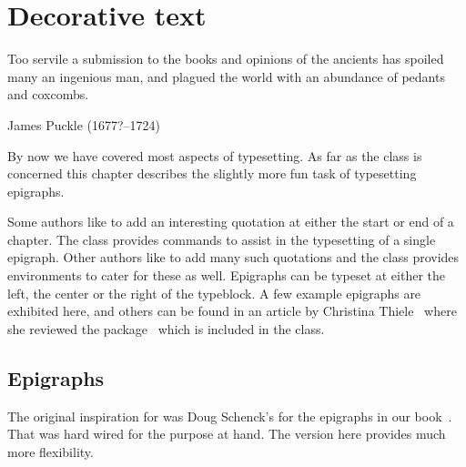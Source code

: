 \chapter{Decorative text} \label{chap:signposts}


\newcommand{\tepi}[2]{\epigraph{#1}{#2}}

\tepi{Too servile a submission to the books and opinions of the ancients
      has spoiled many an ingenious man, and plagued the world with an
      abundance of pedants and coxcombs.}
     {James Puckle (1677?--1724)}


    By now we have covered most aspects of typesetting. As far as
the class is concerned this chapter describes the slightly more fun 
task of typesetting epigraphs.

     Some authors like to add an interesting quotation 
at either the start or end of a chapter. The class provides commands
to assist in the typesetting of a single epigraph. Other authors like to 
add many such quotations and the class provides 
environments to cater for these as well.
Epigraphs can be typeset at either the left, the center or the right of 
the typeblock. A few example epigraphs are exhibited here, and
others can be found in an article by
Christina Thiele~\cite{TTC199} where she reviewed the 
package~\cite{EPIGRAPH} which is included in the class.

 \section{Epigraphs} 



  The original inspiration for \cmd{\epigraph} was Doug Schenck's
 for the epigraphs in our book~\cite{EBOOK}. That was hard wired for
 the purpose at hand. The version here provides much more flexibility.



